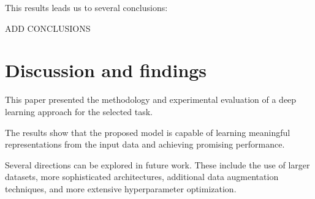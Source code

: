 \documentclass[11pt,a4paper,twocolumn]{article}
\begin{document}
This results leads us to several conclusions:

ADD CONCLUSIONS


\section{Discussion and findings}
\label{sec:conclusions}

This paper presented the methodology and experimental evaluation
of a deep learning approach for the selected task.

The results show that the proposed model is capable of learning
meaningful representations from the input data and achieving
promising performance.

Several directions can be explored in future work. These include
the use of larger datasets, more sophisticated architectures,
additional data augmentation techniques, and more extensive
hyperparameter optimization.

\printbibliography
\end{document}
